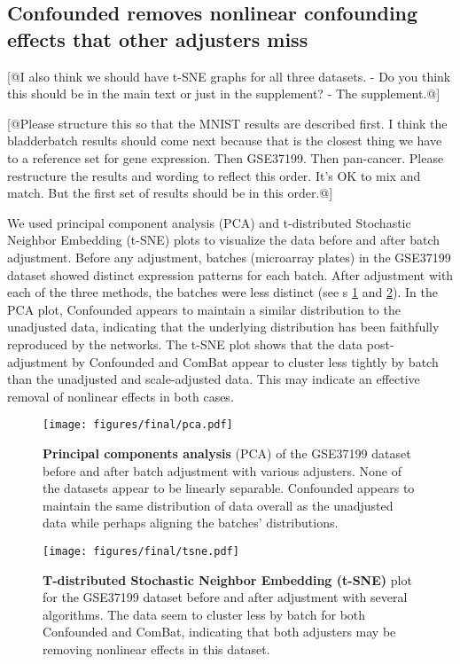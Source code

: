 \subsection{Confounded removes nonlinear confounding effects that other adjusters miss}

[@I also think we should have t-SNE graphs for all three datasets. - Do you think this should be in the main text or just in the supplement? - The supplement.@]

[@Please structure this so that the MNIST results are described first. I think the bladderbatch results should come next because that is the closest thing we have to a reference set for gene expression. Then GSE37199. Then pan-cancer. Please restructure the results and wording to reflect this order. It's OK to mix and match. But the first set of results should be in this order.@]

We used principal component analysis (PCA) and t-distributed Stochastic Neighbor Embedding (t-SNE) \citep{maaten_visualizing_2008} plots to visualize the data before and after batch adjustment.
Before any adjustment, batches (microarray plates) in the GSE37199 dataset showed distinct expression patterns for each batch.
After adjustment with each of the three methods, the batches were less distinct (see \figurename{s} \ref{fig:pca} and \ref{fig:tsne}).
In the PCA plot, Confounded appears to maintain a similar distribution to the unadjusted data, indicating that the underlying distribution has been faithfully reproduced by the networks.
The t-SNE plot shows that the data post-adjustment by Confounded and ComBat appear to cluster less tightly by batch than the unadjusted and scale-adjusted data.
This may indicate an effective removal of nonlinear effects in both cases.

\begin{figure}
	\centering
	\texttt{[image: figures/final/pca.pdf]}
	\caption[Principal components analysis (PCA)]{\textbf{Principal components analysis} (PCA) of the GSE37199 dataset before and after batch adjustment with various adjusters.
	None of the datasets appear to be linearly separable.
	Confounded appears to maintain the same distribution of data overall as the unadjusted data while perhaps aligning the batches' distributions.}
	\label{fig:pca}
\end{figure}
\begin{figure}
	\centering
	\texttt{[image: figures/final/tsne.pdf]}
	\caption[T-distributed Stochastic Neighbor Embedding (t-SNE)]{\textbf{T-distributed Stochastic Neighbor Embedding (t-SNE)} plot for the GSE37199 dataset before and after adjustment with several algorithms.
	The data seem to cluster less by batch for both Confounded and ComBat, indicating that both adjusters may be removing nonlinear effects in this dataset.}
	\label{fig:tsne}
\end{figure}

